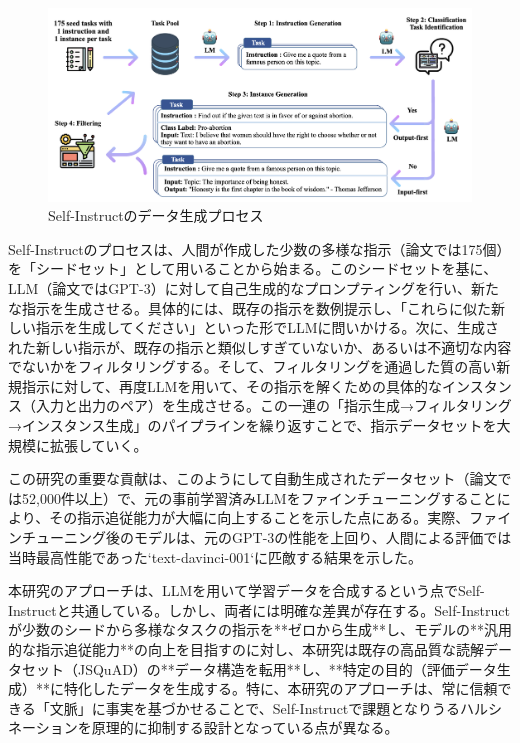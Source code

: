 \documentclass[a4paper,11pt]{jreport}
\begin{document}
\begin{figure}[t]
  \centering
  \includegraphics[width=\linewidth]{./fig/self-instruct_fig1.png}
  \caption{Self-Instructのデータ生成プロセス\cite{Self-Instruct}}
  \label{fig:self_instruct_example}
\end{figure}

Self-Instructのプロセスは、人間が作成した少数の多様な指示（論文では175個）を「シードセット」として用いることから始まる。このシードセットを基に、LLM（論文ではGPT-3）に対して自己生成的なプロンプティングを行い、新たな指示を生成させる。具体的には、既存の指示を数例提示し、「これらに似た新しい指示を生成してください」といった形でLLMに問いかける。次に、生成された新しい指示が、既存の指示と類似しすぎていないか、あるいは不適切な内容でないかをフィルタリングする。そして、フィルタリングを通過した質の高い新規指示に対して、再度LLMを用いて、その指示を解くための具体的なインスタンス（入力と出力のペア）を生成させる。この一連の「指示生成→フィルタリング→インスタンス生成」のパイプラインを繰り返すことで、指示データセットを大規模に拡張していく。

この研究の重要な貢献は、このようにして自動生成されたデータセット（論文では52,000件以上）で、元の事前学習済みLLMをファインチューニングすることにより、その指示追従能力が大幅に向上することを示した点にある。実際、ファインチューニング後のモデルは、元のGPT-3の性能を上回り、人間による評価では当時最高性能であった`text-davinci-001`に匹敵する結果を示した\cite{Self-Instruct}。

本研究のアプローチは、LLMを用いて学習データを合成するという点でSelf-Instructと共通している。しかし、両者には明確な差異が存在する。Self-Instructが少数のシードから多様なタスクの指示を**ゼロから生成**し、モデルの**汎用的な指示追従能力**の向上を目指すのに対し、本研究は既存の高品質な読解データセット（JSQuAD）の**データ構造を転用**し、**特定の目的（評価データ生成）**に特化したデータを生成する。特に、本研究のアプローチは、常に信頼できる「文脈」に事実を基づかせることで、Self-Instructで課題となりうるハルシネーションを原理的に抑制する設計となっている点が異なる。
\end{document}
